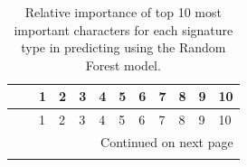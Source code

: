 \documentclass[fleqn,10pt]{wlscirep}
\begin{document}
\tiny
\begin{longtable}{p{}p{}p{}p{}p{}p{}p{}p{}p{}p{}p{}p{}}
    \caption{\label{tab:imp_cls}Relative importance of top 10 most important characters for each signature type in
        predicting using the Random Forest model.}\\
    \toprule
                                &                 &                                                  1 &                                                  2 &                                                  3 &                                                  4 &                                                  5 &                                                  6 &                                                  7 &                                                  8 &                                                  9 &                                                  10 \\
    \midrule
    \endfirsthead

    \toprule
                                &                 &                                                  1 &                                                  2 &                                                  3 &                                                  4 &                                                  5 &                                                  6 &                                                  7 &                                                  8 &                                                  9 &                                                  10 \\
    \midrule
    \endhead
    \midrule
    \multicolumn{12}{r}{{Continued on next page}} \\
    \midrule
    \endfoot


\end{longtable}
\end{document}

